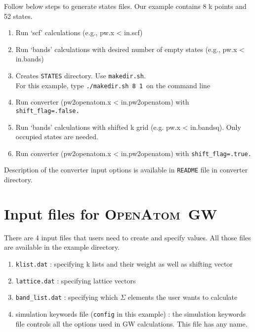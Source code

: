\documentclass[12pt,draft]{article}
\newcommand{\openatom}{\textsc{OpenAtom}}
\newcommand{\note}[1]{{\bf \large \color{red} #1}}
\begin{document}
\noindent Follow below steps to generate states files. Our example contains 8 k points and 52 states.
\begin{enumerate}

\item Run `scf' calculations (e.g., pw.x < in.scf)

\item Run `bands' calculations with desired number of empty states (e.g., pw.x < in.bands)

\item Creates \verb+STATES+ directory. Use \verb+makedir.sh+. \\
For this example, type \verb+./makedir.sh 8 1+\ on the command line

\item Run converter (pw2openatom.x < in.pw2openatom) with \verb+shift_flag=.false.+

\item Run `bands' calculations with shifted k grid (e.g. pw.x < in.bandsq). Only occupied states are needed.

\item Run converter  (pw2openatom.x < in.pw2openatom) with \verb+shift_flag=.true.+
 
\end{enumerate}


\noindent Description of the converter input options is available in \verb+README+ file in converter directory. 

\section{Input files for \openatom\ GW}
\noindent There are 4 input files that users need to create and specify values. All those files are available in the example directory.

\begin{enumerate}
\item \verb+klist.dat+ : specifying k lists and their weight as well as shifting vector
\item \verb+lattice.dat+ : specifying lattice vectors
\item \verb+band_list.dat+ : specifying which $\Sigma$ elements the user wants to calculate
\item simulation keywords file (\verb+config+ in this example) : the simulation keywords file controls all the options used in GW calculations. This file has any name.  
\end{enumerate}
\end{document}
